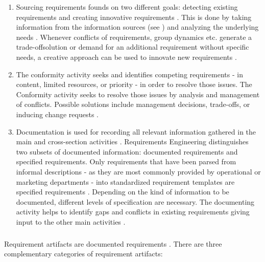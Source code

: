 \begin{enumerate}
    \item Sourcing requirements founds on two different goals: detecting existing requirements and creating innovative requirements \parencite[cf.][318, 321]{Pohl.2007}. This is done by taking information from the information sources (see ) and analyzing the underlying needs \parencite[cf.][75-76]{Sommerville.2000}. Whenever conflicts of requirements, group dynamics etc. generate a trade-offsolution or demand for an additional requirement without specific needs, a creative approach can be used to innovate new requirements \parencite[cf.][94]{Lauesen.2008}. 
    \item The conformity activity seeks and identifies competing requirements - in content, limited resources, or priority - in order to resolve those issues. The Conformity activity seeks to resolve those issues by analysis and management of conflicts. Possible solutions include management decisions, trade-offs, or inducing change requests \parencite[cf.][393]{Pohl.2007}.
    \item{Documentation} is used for recording all relevant information gathered in the main and cross-section activities \parencite[cf.][217]{Pohl.2007}. Requirements Engineering distinguishes two subsets of documented information: documented requirements and specified requirements. Only requirements that have been parsed from informal descriptions - as they are most commonly provided by operational or marketing departments - into standardized requirement templates are specified requirements \parencite[cf.][101]{Ebert.2014}. Depending on the kind of information to be documented, different levels of specification are necessary. The documenting activity helps to identify gaps and conflicts in existing requirements giving input to the other main activities \parencite[212]{Pohl.2007}.\label{endmain}
\end{enumerate}

\subparagraph{} Requirement artifacts are documented requirements \parencite[85]{Pohl.2007}. There are three complementary categories of requirement artifacts: 

